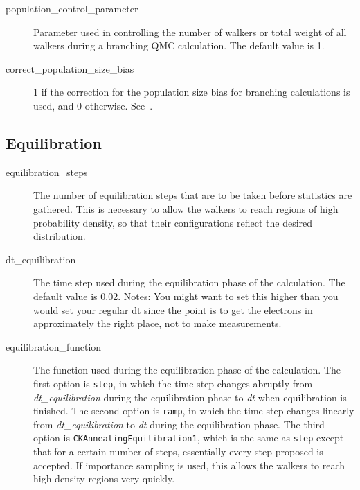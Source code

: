 \documentclass[11pt]{article}
\begin{document}
\begin{description}
\item [population\_control\_parameter] Parameter used in
  controlling the number of walkers or total weight of all walkers
  during a branching QMC calculation.  The default value is 1.

\item [correct\_population\_size\_bias] 1 if the correction for the
  population size bias for branching calculations is used, and 0
  otherwise. See~\cite{UmrigarNightingaleRunge1993}.

\end{description}

\subsection{Equilibration}

\begin{description}

\item [equilibration\_steps]  The number of equilibration steps that are
  to be taken before statistics are gathered.  This is necessary to
  allow the walkers to reach regions of high probability density, so
  that their configurations reflect the desired distribution.  

\item [dt\_equilibration]  The time step used during the equilibration
  phase of the calculation.  The default value is 0.02.
  Notes: You might want to set this higher than you would set your                                                                                                    
     regular dt since the point is to get the electrons in approximately                                                                                                 
     the right place, not to make measurements. 

\item [equilibration\_function]  The function used during the
  equilibration phase of the calculation.  The first option is 
  \verb-step-, in which the time step changes abruptly from
  \emph{dt\_equilibration} during the equilibration phase to \emph{dt}
  when equilibration is finished.  The second option is \verb-ramp-,
  in which the time step changes linearly from \emph{dt\_equilibration}
  to \emph{dt} during the equilibration phase.  The third option is
  \verb-CKAnnealingEquilibration1-, which is the same as \verb-step-
  except that for a certain number of steps, essentially every step
  proposed is accepted.  If importance sampling is used, this allows
  the walkers to reach high density regions very quickly.


\end{description}
\end{document}
